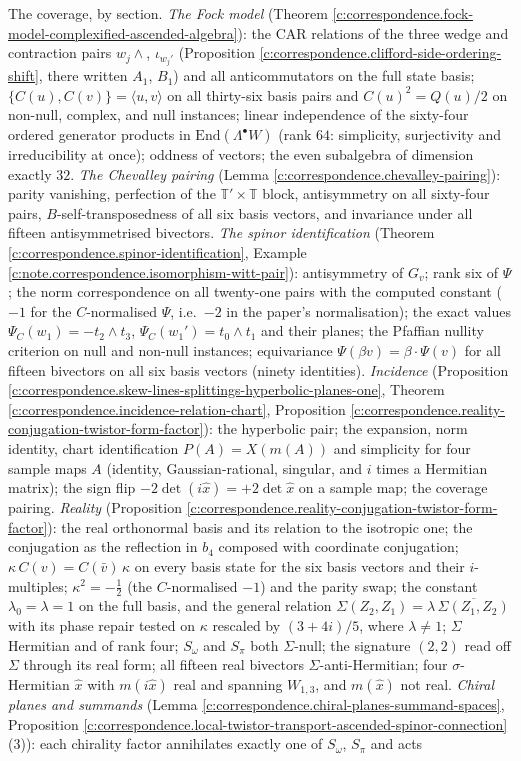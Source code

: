 \documentclass[11pt]{article}
\theoremstyle{definition}
\theoremstyle{plain}
\providecommand{\End}{}\renewcommand{\End}{\mathrm{End}}
\providecommand{\Som}{}\renewcommand{\Som}{S_\omega}
\providecommand{\Spi}{}\renewcommand{\Spi}{S_\pi}
\providecommand{\T}{}\renewcommand{\T}{\mathbb{T}}
\providecommand{\ip}{}\renewcommand{\ip}[2]{\langle #1, #2\rangle}
\begin{document}
The coverage, by section. \emph{The Fock model} (Theorem \ref{c:correspondence.fock-model-complexified-ascended-algebra}): the CAR relations of the three wedge and contraction pairs $w_j\wedge$, $\iota_{w_j'}$ (Proposition \ref{c:correspondence.clifford-side-ordering-shift}, there written $A_1$, $B_1$) and all anticommutators on the full state basis; $\{C(u), C(v)\} = \ip{u}{v}$ on all thirty-six basis pairs and $C(u)^2 = Q(u)/2$ on non-null, complex, and null instances; linear independence of the sixty-four ordered generator products in $\End(\Lambda^\bullet W)$ (rank $64$: simplicity, surjectivity and irreducibility at once); oddness of vectors; the even subalgebra of dimension exactly $32$. \emph{The Chevalley pairing} (Lemma \ref{c:correspondence.chevalley-pairing}): parity vanishing, perfection of the $\T'\times\T$ block, antisymmetry on all sixty-four pairs, $B$-self-transposedness of all six basis vectors, and invariance under all fifteen antisymmetrised bivectors. \emph{The spinor identification} (Theorem \ref{c:correspondence.spinor-identification}, Example \ref{c:note.correspondence.isomorphism-witt-pair}): antisymmetry of $G_v$; rank six of $\Psi$; the norm correspondence on all twenty-one pairs with the computed constant ($-1$ for the $C$-normalised $\Psi$, i.e.\ $-2$ in the paper's normalisation); the exact values $\Psi_C(w_1) = -t_2\wedge t_3$, $\Psi_C(w_1') = t_0 \wedge t_1$ and their planes; the Pfaffian nullity criterion on null and non-null instances; equivariance $\Psi(\beta v) = \beta\cdot\Psi(v)$ for all fifteen bivectors on all six basis vectors (ninety identities). \emph{Incidence} (Proposition \ref{c:correspondence.skew-lines-splittings-hyperbolic-planes-one}, Theorem \ref{c:correspondence.incidence-relation-chart}, Proposition \ref{c:correspondence.reality-conjugation-twistor-form-factor}): the hyperbolic pair; the expansion, norm identity, chart identification $P(A) = X(m(A))$ and simplicity for four sample maps $A$ (identity, Gaussian-rational, singular, and $i$ times a Hermitian matrix); the sign flip $-2\det(i\hat x) = +2\det\hat x$ on a sample map; the coverage pairing. \emph{Reality} (Proposition \ref{c:correspondence.reality-conjugation-twistor-form-factor}): the real orthonormal basis and its relation to the isotropic one; the conjugation as the reflection in $b_4$ composed with coordinate conjugation; $\kappa\,C(v) = C(\bar v)\,\kappa$ on every basis state for the six basis vectors and their $i$-multiples; $\kappa^2 = -\tfrac12$ (the $C$-normalised $-1$) and the parity swap; the constant $\lambda_0 = \lambda = 1$ on the full basis, and the general relation $\Sigma(Z_2,Z_1) = \lambda\,\overline{\Sigma(Z_1,Z_2)}$ with its phase repair tested on $\kappa$ rescaled by $(3+4i)/5$, where $\lambda \neq 1$; $\Sigma$ Hermitian and of rank four; $\Som$ and $\Spi$ both $\Sigma$-null; the signature $(2,2)$ read off $\Sigma$ through its real form; all fifteen real bivectors $\Sigma$-anti-Hermitian; four $\sigma$-Hermitian $\hat x$ with $m(i\hat x)$ real and spanning $W_{1,3}$, and $m(\hat x)$ not real. \emph{Chiral planes and summands} (Lemma \ref{c:correspondence.chiral-planes-summand-spaces}, Proposition \ref{c:correspondence.local-twistor-transport-ascended-spinor-connection}(3)): each chirality factor annihilates exactly one of $\Som$, $\Spi$ and acts 
\end{document}
